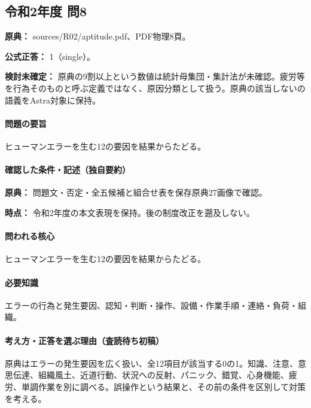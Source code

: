 \subsection{令和2年度 問8}
\label{q:r02-reg-apt-08}

\noindent\textbf{原典：} sources/R02/aptitude.pdf、PDF物理8頁。

\textbf{公式正答：} 1（single）。

\par\textbf{検討未確定：} 原典の9割以上という数値は統計母集団・集計法が未確認。疲労等を行為そのものと呼ぶ定義ではなく、原因分類として扱う。原典の該当しないの語義をAstra対象に保持。

\paragraph{問題の要旨} ヒューマンエラーを生む12の要因を結果からたどる。

\paragraph{確認した条件・記述（独自要約）}\mbox{}\par

\noindent\textbf{原典：} 問題文・否定・全五候補と組合せ表を保存原典27画像で確認。\par

\noindent\textbf{時点：} 令和2年度の本文表現を保持。後の制度改正を遡及しない。\par

\paragraph{問われる核心} ヒューマンエラーを生む12の要因を結果からたどる。

\paragraph{必要知識} エラーの行為と発生要因、認知・判断・操作、設備・作業手順・連絡・負荷・組織。

\paragraph{考え方・正答を選ぶ理由（査読待ち初稿）} 原典はエラーの発生要因を広く扱い、全12項目が該当する0の1。知識、注意、意思伝達、組織風土、近道行動、状況への反射、パニック、錯覚、心身機能、疲労、単調作業を別に調べる。誤操作という結果と、その前の条件を区別して対策を考える。

